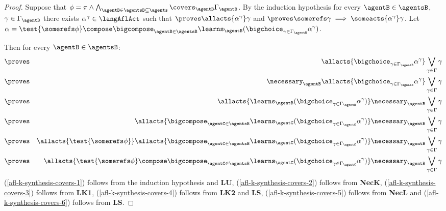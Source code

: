 \documentclass[twoside]{aiml14}
\begin{document}
\begin{proof}
      Suppose that $\phi = \pi \land \bigwedge_{\agentB \in \agentsB \subseteq \agents} \covers_\agentB \Gamma_\agentB$.
      By the induction hypothesis for every $\agentB \in \agentsB$, $\gamma \in \Gamma_\agentB$
      there exists $\alpha^\gamma \in \langAflAct$ such that 
      $\proves \allacts{\alpha^\gamma} \gamma$ and 
      $\proves \somerefs \gamma \implies \someacts{\alpha^\gamma} \gamma$.
      Let $\alpha = \test{\somerefs \phi} \compose \bigcompose_{\agentB \in \agentsB} \learns_\agentB (\bigchoice_{\gamma \in \Gamma_\agentB} \alpha^\gamma)$.

      Then for every $\agentB \in \agentsB$: 
      \begin{eqnarray}
          &\proves& \allacts{\bigchoice_{\gamma \in \Gamma_\agentB} \alpha^\gamma} \bigvee_{\gamma \in \Gamma} \gamma\label{afl-k-synthesis-covers-1}\\
          &\proves& \necessary_\agentB \allacts{\bigchoice_{\gamma \in \Gamma_\agentB} \alpha^\gamma} \bigvee_{\gamma \in \Gamma} \gamma\label{afl-k-synthesis-covers-2}\\
          &\proves& \allacts{\learns_\agentB (\bigchoice_{\gamma \in \Gamma_\agentB} \alpha^\gamma)} \necessary_\agentB \bigvee_{\gamma \in \Gamma} \gamma\label{afl-k-synthesis-covers-3}\\
          &\proves& \allacts{\bigcompose_{\agentC \in \agentsB} \learns_\agentC (\bigchoice_{\gamma \in \Gamma_\agentC} \alpha^\gamma)} \necessary_\agentB \bigvee_{\gamma \in \Gamma} \gamma\label{afl-k-synthesis-covers-4}\\
          &\proves& \allacts{\test{\somerefs \phi}} \allacts{\bigcompose_{\agentC \in \agentsB} \learns_\agentC (\bigchoice_{\gamma \in \Gamma_\agentC} \alpha^\gamma)} \necessary_\agentB \bigvee_{\gamma \in \Gamma} \gamma\label{afl-k-synthesis-covers-5}\\
          &\proves& \allacts{\test{\somerefs \phi} \compose \bigcompose_{\agentC \in \agentsB} \learns_\agentC (\bigchoice_{\gamma \in \Gamma_\agentC} \alpha^\gamma)} \necessary_\agentB \bigvee_{\gamma \in \Gamma} \gamma\label{afl-k-synthesis-covers-6}
      \end{eqnarray}
      (\ref{afl-k-synthesis-covers-1}) follows from the induction hypothesis and {\bf LU},
      (\ref{afl-k-synthesis-covers-2}) follows from {\bf NecK},
      (\ref{afl-k-synthesis-covers-3}) follows from {\bf LK1},
      (\ref{afl-k-synthesis-covers-4}) follows from {\bf LK2} and {\bf LS},
      (\ref{afl-k-synthesis-covers-5}) follows from {\bf NecL} and
      (\ref{afl-k-synthesis-covers-6}) follows from {\bf LS}.


\end{proof}
\end{document}

